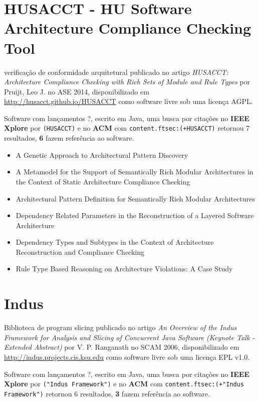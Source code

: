 \section{HUSACCT - HU Software Architecture Compliance Checking Tool}

verificação de conformidade arquitetural
publicado no artigo {\it HUSACCT: Architecture Compliance Checking with Rich Sets of Module and Rule Types}
por Pruijt, Leo J.
no ASE 2014,
disponibilizado em \url{http://husacct.github.io/HUSACCT}
como software livre
sob uma licença AGPL.

Software com lançamentos ?,
escrito em Java,
uma busca por citações no {\bf IEEE Xplore} por
\texttt{(HUSACCT)}
e no {\bf ACM} com
\texttt{content.ftsec:(+HUSACCT)}
retornou
7 resultados,
{\bf 6} fazem referência ao software.

\begin{itemize}
\item A Genetic Approach to Architectural Pattern Discovery
\item A Metamodel for the Support of Semantically Rich Modular Architectures in the Context of Static Architecture Compliance Checking
\item Architectural Pattern Definition for Semantically Rich Modular Architectures
\item Dependency Related Parameters in the Reconstruction of a Layered Software Architecture
\item Dependency Types and Subtypes in the Context of Architecture Reconstruction and Compliance Checking
\item Rule Type Based Reasoning on Architecture Violations: A Case Study
\end{itemize}


\section{Indus}

Biblioteca de program slicing
publicado no artigo {\it An Overview of the Indus Framework for Analysis and Slicing of Concurrent Java Software (Keynote Talk - Extended Abstract)}
por V. P. Ranganath
no SCAM 2006,
disponibilizado em \url{http://indus.projects.cis.ksu.edu}
como software livre
sob uma licença EPL v1.0.

Software com lançamentos ?,
escrito em Java,
uma busca por citações no {\bf IEEE Xplore} por
\texttt{("Indus Framework")}
e no {\bf ACM} com
\texttt{content.ftsec:(+"Indus Framework")}
retornou
6 resultados,
{\bf 3} fazem referência ao software.

